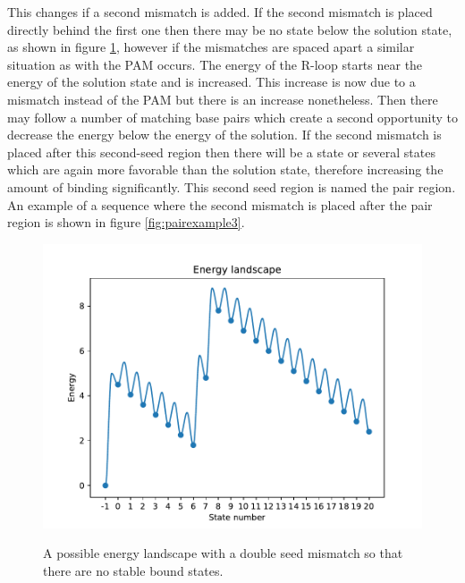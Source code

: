 This changes if a second mismatch is added. If the second mismatch is placed directly behind the first one then there may be no state below the solution state, as shown in figure \ref{fig:pairexample2}, however if the mismatches are spaced apart a similar situation as with the PAM occurs. The energy of the R-loop starts near the energy of the solution state and is increased. This increase is now due to a mismatch instead of the PAM but there is an increase nonetheless. Then there may follow a number of matching base pairs which create a second opportunity to decrease the energy below the energy of the solution. If the second mismatch is placed after this second-seed region then there will be a state or several states which are again more favorable than the solution state, therefore increasing the amount of binding significantly. This second seed region is named the pair region. An example of a sequence where the second mismatch is placed after the pair region is shown in figure \ref{fig:pairexample3}.

\begin{figure}[H]
\begin{center}
\includegraphics[width=\textwidth]{images/pairexample2}
\label{fig:pairexample2}
\caption{A possible energy landscape with a double seed mismatch so that there are no stable bound states.}
\end{center}
\end{figure}

